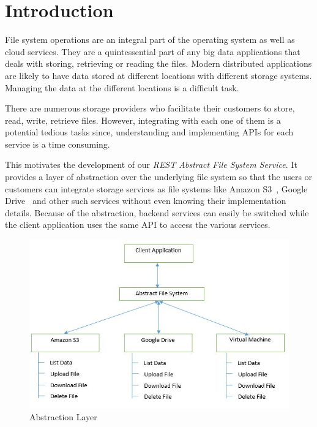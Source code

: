 \maketitle


\section{Introduction}

File system operations are an integral part of the operating system as
well as cloud services. They are a quintessential part of any big data
applications that deals with storing, retrieving or reading the
files. Modern distributed applications are likely to have data stored at
different locations with different storage systems. Managing the data
at the different locations is a difficult task.

There are numerous storage providers who facilitate their customers to
store, read, write, retrieve files. However, integrating with each one
of them is a potential tedious tasks since, understanding and
implementing APIs for each service is a time consuming.

This motivates the development of our \emph{REST Abstract File System
 Service}. It provides a layer of abstraction over the underlying
file system so that the users or customers can integrate storage
services as file systems like Amazon S3~\cite{hid-sp18-420-amazon-S3},
Google Drive~\cite{hid-sp18-420-google-drive} and other such services
without even knowing their implementation details. Because of the
abstraction, backend services can easily be switched while the client
application uses the same API to access the various services.


\begin{figure}[!ht]
        \centering\includegraphics[width=\columnwidth]
        {image/architecture.JPG}
        \caption{Abstraction Layer}\label{fig:architecture}
\end{figure}

